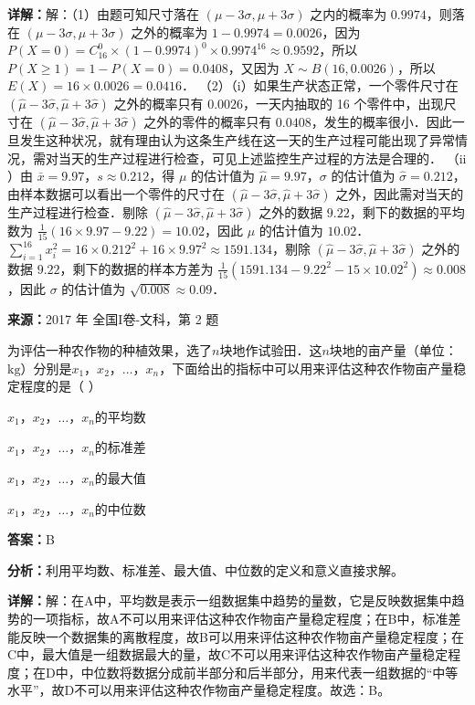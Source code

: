 \begin{question}[points=12]
\begin{solution}
\textbf{详解：}解：（1）由题可知尺寸落在 $(\mu-3\sigma,\mu+3\sigma)$ 之内的概率为 $0.9974$，则落在 $(\mu-3\sigma,\mu+3\sigma)$ 之外的概率为 $1-0.9974=0.0026$，因为 $P(X=0)=C_{16}^0\times(1-0.9974)^0\times0.9974^{16}\approx0.9592$，所以 $P(X\geq1)=1-P(X=0)=0.0408$，又因为 $X\sim B(16,0.0026)$，所以 $E(X)=16\times0.0026=0.0416$．
（2）（$\text{i}$）如果生产状态正常，一个零件尺寸在 $(\hat{\mu}-3\hat{\sigma},\hat{\mu}+3\hat{\sigma})$ 之外的概率只有 $0.0026$，一天内抽取的 16 个零件中，出现尺寸在 $(\hat{\mu}-3\hat{\sigma},\hat{\mu}+3\hat{\sigma})$ 之外的零件的概率只有 $0.0408$，发生的概率很小．因此一旦发生这种状况，就有理由认为这条生产线在这一天的生产过程可能出现了异常情况，需对当天的生产过程进行检查，可见上述监控生产过程的方法是合理的．
（$\text{ii}$）由 $\bar{x}=9.97$，$s\approx0.212$，得 $\mu$ 的估计值为 $\hat{\mu}=9.97$，$\sigma$ 的估计值为 $\hat{\sigma}=0.212$，由样本数据可以看出一个零件的尺寸在 $(\hat{\mu}-3\hat{\sigma},\hat{\mu}+3\hat{\sigma})$ 之外，因此需对当天的生产过程进行检查．剔除 $(\hat{\mu}-3\hat{\sigma},\hat{\mu}+3\hat{\sigma})$ 之外的数据 $9.22$，剩下的数据的平均数为 $\frac{1}{15}(16\times9.97-9.22)=10.02$，因此 $\mu$ 的估计值为 $10.02$．$\sum_{i=1}^{16}x_i^2=16\times0.212^2+16\times9.97^2\approx1591.134$，剔除 $(\hat{\mu}-3\hat{\sigma},\hat{\mu}+3\hat{\sigma})$ 之外的数据 $9.22$，剩下的数据的样本方差为 $\frac{1}{15}(1591.134-9.22^2-15\times10.02^2)\approx0.008$，因此 $\sigma$ 的估计值为 $\sqrt{0.008}\approx0.09$．
\end{solution}
\end{question}

\begin{question}[points=5]
\textbf{来源：}2017 年 全国I卷-文科，第 2 题\par
为评估一种农作物的种植效果，选了$n$块地作试验田．这$n$块地的亩产量（单位：$\text{kg}$）分别是$x_1$，$x_2$，$\ldots$，$x_n$，下面给出的指标中可以用来评估这种农作物亩产量稳定程度的是（           ）
\begin{choices}
  \item $x_1$，$x_2$，$\ldots$，$x_n$的平均数
  \item $x_1$，$x_2$，$\ldots$，$x_n$的标准差
  \item $x_1$，$x_2$，$\ldots$，$x_n$的最大值
  \item $x_1$，$x_2$，$\ldots$，$x_n$的中位数
\end{choices}
\begin{solution}
\textbf{答案：}B

\textbf{分析：}利用平均数、标准差、最大值、中位数的定义和意义直接求解。

\textbf{详解：}解：在A中，平均数是表示一组数据集中趋势的量数，它是反映数据集中趋势的一项指标，故A不可以用来评估这种农作物亩产量稳定程度；在B中，标准差能反映一个数据集的离散程度，故B可以用来评估这种农作物亩产量稳定程度；在C中，最大值是一组数据最大的量，故C不可以用来评估这种农作物亩产量稳定程度；在D中，中位数将数据分成前半部分和后半部分，用来代表一组数据的“中等水平”，故D不可以用来评估这种农作物亩产量稳定程度。故选：B。
\end{solution}
\end{question}

